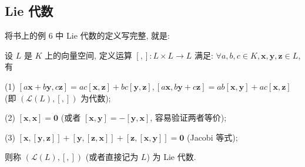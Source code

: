 \documentclass[color=black,device=normal,lang=cn,mode=geye]{elegantnote}
\begin{document}
\subsection{Lie 代数}
将书上的例 6 中 Lie 代数的定义写完整, 就是:
\begin{definition}
    设 $L$ 是 $K$ 上的向量空间, 定义运算 $[,]:L\times L\to L$ 满足: $\forall a,b,c\in K,\boldsymbol{x},\boldsymbol{y},\boldsymbol{z}\in L$, 有

    (1) $[a\boldsymbol{x}+b\boldsymbol{y},c\boldsymbol{z}]=ac[\boldsymbol{x},\boldsymbol{z}]+bc[\boldsymbol{y},\boldsymbol{z}],[a\boldsymbol{x},b\boldsymbol{y}+c\boldsymbol{z}]=ab[\boldsymbol{x},\boldsymbol{y}]+ac[\boldsymbol{x},\boldsymbol{z}]$ (即 $(\mathcal{L}(L),[,])$ 为代数);

    (2) $[\boldsymbol{x},\boldsymbol{x}]=\boldsymbol{0}$ (或者 $[\boldsymbol{x},\boldsymbol{y}]=-[\boldsymbol{y},\boldsymbol{x}]$, 容易验证两者等价);

    (3) $[\boldsymbol{x},[\boldsymbol{y},\boldsymbol{z}]]+[\boldsymbol{y},[\boldsymbol{z},\boldsymbol{x}]]+[\boldsymbol{z},[\boldsymbol{x},\boldsymbol{y}]]=\boldsymbol{0}$ (Jacobi 等式);

    则称 $(\mathcal{L}(L),[,])$ (或者直接记为 $L$) 为 Lie 代数.
\end{definition}
\end{document}
